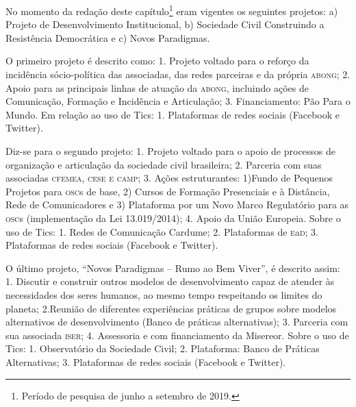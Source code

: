 No momento da redação deste capítulo\footnote{Período de pesquisa de
  junho a setembro de 2019.} eram vigentes os seguintes projetos: a)
Projeto de Desenvolvimento Institucional, b) Sociedade Civil Construindo
a Resistência Democrática e c) Novos Paradigmas. 

O primeiro projeto é descrito como: 1. Projeto voltado para o reforço da
incidência sócio-política das associadas, das redes parceiras e da própria \textsc{abong};
2. Apoio para as principais linhas de atuação da \textsc{abong}, incluindo
ações de Comunicação, Formação e Incidência e Articulação; 3. Financiamento: Pão Para o Mundo. Em relação ao uso de Tics: 1. Plataformas de redes sociais (Facebook e
Twitter).

Diz-se para o segundo projeto: 1. Projeto voltado para o apoio de
processos de organização e articulação da sociedade civil brasileira;
2. Parceria com suas associadas \textsc{cfemea, cese e camp};
3. Ações estruturantes: 1)Fundo de Pequenos Projetos para \textsc{osc}s
de base, 2) Cursos de Formação Presenciais e à Distância, Rede de
Comunicadores e 3) Plataforma por um Novo Marco Regulatório
para as \textsc{osc}s (implementação da Lei 13.019/2014);
4. Apoio da União Europeia. Sobre o uso de Tics: 1. Redes de
Comunicação Cardume; 2. Plataformas de \textsc{e}a\textsc{d}; 3. Plataformas
de redes sociais (Facebook e Twitter).

O último projeto, ``Novos Paradigmas -- Rumo ao Bem Viver'', é descrito assim: 
1. Discutir e construir outros modelos de desenvolvimento capaz de atender
às necessidades dos seres humanos, ao mesmo tempo respeitando os
limites do planeta; 2.Reunião de diferentes experiências práticas de grupos sobre modelos
alternativos de desenvolvimento (Banco de práticas alternativas);
3. Parceria com sua associada \textsc{iser}; 4. Assessoria e com financiamento
da Misereor. Sobre o uso de Tics: 1. Observatório
da Sociedade Civil; 2. Plataforma: Banco de Práticas Alternativas;
3. Plataformas de redes sociais (Facebook e Twitter).

